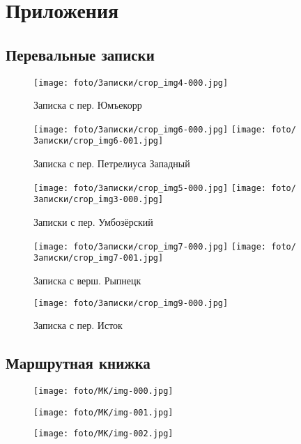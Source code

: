\newpage
\section{Приложения}
\subsection{Перевальные записки}
\begin{figure}[H]
    \centering
    \texttt{[image: foto/Записки/crop\_img4-000.jpg]}
    \caption{Записка с пер. Юмъекорр}
\end{figure}

\begin{figure}
    \centering
    \texttt{[image: foto/Записки/crop\_img6-000.jpg]}
    \texttt{[image: foto/Записки/crop\_img6-001.jpg]}
    \caption{Записка с пер. Петрелиуса Западный}
\end{figure}

\begin{figure}
    \centering
    \texttt{[image: foto/Записки/crop\_img5-000.jpg]}
    \texttt{[image: foto/Записки/crop\_img3-000.jpg]}
    \caption{Записки с пер. Умбозёрский}
\end{figure}

\begin{figure}
    \centering
    \texttt{[image: foto/Записки/crop\_img7-000.jpg]}
    \break
    \break
    \texttt{[image: foto/Записки/crop\_img7-001.jpg]}
    \caption{Записка с верш. Рыпнецк}
\end{figure}

\begin{figure}[H]
    \centering
    \texttt{[image: foto/Записки/crop\_img9-000.jpg]}
    \caption{Записка с пер. Исток}
\end{figure}

\subsection{Маршрутная книжка}
\begin{figure}[H]
    \centering
    \texttt{[image: foto/МК/img-000.jpg]}
\end{figure}

\begin{figure}
    \centering
    \texttt{[image: foto/МК/img-001.jpg]}
\end{figure}

\begin{figure}
    \centering
    \texttt{[image: foto/МК/img-002.jpg]}
\end{figure}

